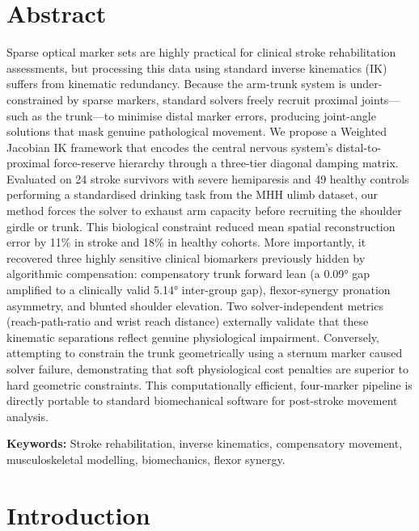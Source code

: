 \documentclass[12pt, a4paper]{article}
\begin{document}
\section*{Abstract}
Sparse optical marker sets are highly practical for clinical stroke rehabilitation assessments, but processing this data using standard inverse kinematics (IK) suffers from kinematic redundancy. Because the arm-trunk system is under-constrained by sparse markers, standard solvers freely recruit proximal joints—such as the trunk—to minimise distal marker errors, producing joint-angle solutions that mask genuine pathological movement. We propose a Weighted Jacobian IK framework that encodes the central nervous system's distal-to-proximal force-reserve hierarchy through a three-tier diagonal damping matrix. Evaluated on 24 stroke survivors with severe hemiparesis and 49 healthy controls performing a standardised drinking task from the MHH ulimb dataset, our method forces the solver to exhaust arm capacity before recruiting the shoulder girdle or trunk. This biological constraint reduced mean spatial reconstruction error by 11\% in stroke and 18\% in healthy cohorts. More importantly, it recovered three highly sensitive clinical biomarkers previously hidden by algorithmic compensation: compensatory trunk forward lean (a 0.09° gap amplified to a clinically valid 5.14° inter-group gap), flexor-synergy pronation asymmetry, and blunted shoulder elevation. Two solver-independent metrics (reach-path-ratio and wrist reach distance) externally validate that these kinematic separations reflect genuine physiological impairment. Conversely, attempting to constrain the trunk geometrically using a sternum marker caused solver failure, demonstrating that soft physiological cost penalties are superior to hard geometric constraints. This computationally efficient, four-marker pipeline is directly portable to standard biomechanical software for post-stroke movement analysis.

\vspace{1em}
\noindent\textbf{Keywords:} Stroke rehabilitation, inverse kinematics, compensatory movement, musculoskeletal modelling, biomechanics, flexor synergy.

\clearpage

\section{Introduction}
\end{document}
